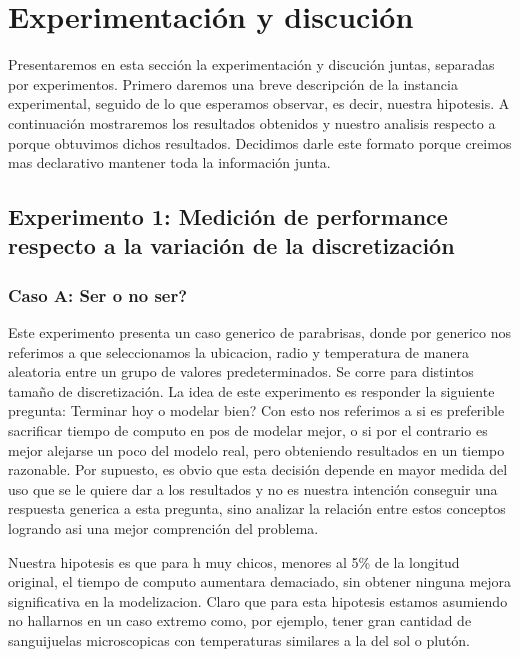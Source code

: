 \section{Experimentaci\'on y discuci\'on}

Presentaremos en esta secci\'on la experimentaci\'on y discuci\'on juntas, separadas por experimentos. Primero 
daremos una breve descripci\'on de la instancia 
experimental, seguido de lo que esperamos observar, es decir, nuestra hipotesis. A continuaci\'on mostraremos los 
resultados obtenidos y nuestro analisis respecto a porque obtuvimos dichos resultados. 
Decidimos darle este formato porque creimos mas declarativo mantener toda la
informaci\'on junta. 

\subsection{Experimento 1: Medici\'on de performance respecto a la variaci\'on de la discretizaci\'on}

\subsubsection{Caso A: \textquestiondown Ser o no ser?}

Este experimento presenta un caso generico de parabrisas, donde por generico nos referimos a que seleccionamos la ubicacion,
radio y temperatura de manera aleatoria entre un grupo de valores predeterminados.
Se corre para distintos tama\~no de discretizaci\'on.
La idea de este experimento
es responder la siguiente pregunta: \textquestiondown Terminar hoy o modelar bien? Con esto nos referimos a si es 
preferible sacrificar tiempo de computo en 
pos de modelar mejor, o si por el contrario es mejor alejarse un poco del modelo real, pero obteniendo resultados 
en un tiempo razonable. Por 
supuesto, es obvio que esta decisi\'on depende en mayor medida del uso que se le quiere dar a los resultados y no 
es nuestra intenci\'on conseguir 
una respuesta generica a esta pregunta, sino analizar la relaci\'on entre estos conceptos logrando asi una mejor 
comprenci\'on del problema. 

Nuestra hipotesis es que para h muy chicos, menores al 5\% de la longitud original, el tiempo de computo aumentara
demaciado, sin obtener ninguna mejora significativa en la modelizacion. Claro que para esta hipotesis estamos 
asumiendo no hallarnos en un caso extremo como, por ejemplo, tener gran cantidad de sanguijuelas microscopicas
con temperaturas similares a la del sol o plut\'on.

